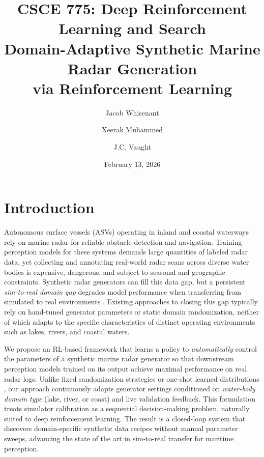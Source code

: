 \documentclass[12pt]{article}
\title{
\textbf{CSCE 775: Deep Reinforcement Learning and Search} \\[0.5em]
\Large Domain-Adaptive Synthetic Marine Radar Generation \\
via Reinforcement Learning
}
\author{
Jacob Whisenant \and Xeerak Muhammed \and J.C. Vaught
}
\date{February 13, 2026}
\begin{document}
\maketitle

\section{Introduction}

Autonomous surface vessels (ASVs) operating in inland and coastal waterways rely on marine radar for reliable obstacle detection and navigation. Training perception models for these systems demands large quantities of labeled radar data, yet collecting and annotating real-world radar scans across diverse water bodies is expensive, dangerous, and subject to seasonal and geographic constraints. Synthetic radar generators can fill this data gap, but a persistent \textit{sim-to-real domain gap} degrades model performance when transferring from simulated to real environments \citep{Bousmalis2018SimToReal, Tobin2017DomainRandomization}. Existing approaches to closing this gap typically rely on hand-tuned generator parameters or static domain randomization, neither of which adapts to the specific characteristics of distinct operating environments such as lakes, rivers, and coastal waters.

We propose an RL-based framework that learns a policy to \textit{automatically} control the parameters of a synthetic marine radar generator so that downstream perception models trained on its output achieve maximal performance on real radar logs. Unlike fixed randomization strategies \citep{Tobin2017DomainRandomization} or one-shot learned distributions \citep{Kar2019MetaSim}, our approach continuously adapts generator settings conditioned on \textit{water-body domain type} (lake, river, or coast) and live validation feedback. This formulation treats simulator calibration as a sequential decision-making problem, naturally suited to deep reinforcement learning. The result is a closed-loop system that discovers domain-specific synthetic data recipes without manual parameter sweeps, advancing the state of the art in sim-to-real transfer for maritime perception.
\end{document}
